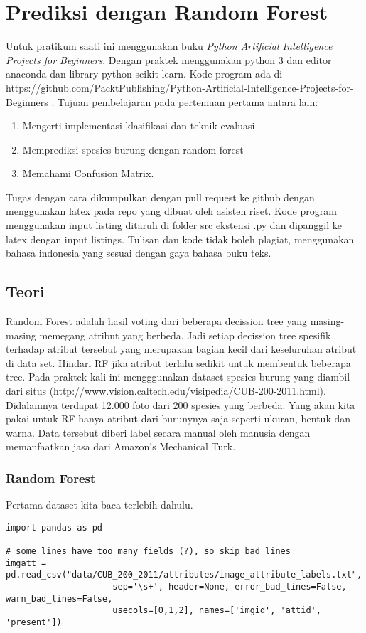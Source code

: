 \chapter{Prediksi dengan Random Forest}

Untuk pratikum saati ini menggunakan buku \textit{Python Artificial Intelligence Projects for Beginners}\cite{eckroth2018python}. Dengan praktek menggunakan python 3 dan editor anaconda dan library python scikit-learn.
Kode program ada di https://github.com/PacktPublishing/Python-Artificial-Intelligence-Projects-for-Beginners .
Tujuan pembelajaran pada pertemuan pertama antara lain:
\begin{enumerate}
\item
Mengerti implementasi klasifikasi dan teknik evaluasi
\item
Memprediksi spesies burung dengan random forest
\item
Memahami Confusion Matrix.
\end{enumerate}
Tugas dengan cara dikumpulkan dengan pull request ke github dengan menggunakan latex pada repo yang dibuat oleh asisten riset. Kode program menggunakan input listing ditaruh di folder src ekstensi .py dan dipanggil ke latex dengan input listings. Tulisan dan kode tidak boleh plagiat, menggunakan bahasa indonesia yang sesuai dengan gaya bahasa buku teks.

\section{Teori}
Random Forest adalah hasil voting dari beberapa decission tree yang masing-masing memegang atribut yang berbeda. Jadi setiap decission tree spesifik terhadap atribut tersebut yang merupakan bagian kecil dari keseluruhan atribut di data set. Hindari RF jika atribut terlalu sedikit untuk membentuk beberapa tree. Pada praktek kali ini mengggunakan dataset spesies burung yang diambil dari situs 
(http://www.vision.caltech.edu/visipedia/CUB-200-2011.html). Didalamnya terdapat 12.000 foto dari 200 spesies yang berbeda. Yang akan kita pakai untuk RF hanya atribut dari burunynya saja seperti ukuran, bentuk dan warna. Data tersebut diberi label secara manual oleh manusia dengan memanfaatkan jasa dari Amazon's Mechanical Turk.

\subsection{Random Forest}
Pertama dataset kita baca terlebih dahulu.
\begin{lstlisting}[caption=Membaca data file txt,label={lst:fungsisederhana}]
import pandas as pd

# some lines have too many fields (?), so skip bad lines
imgatt = pd.read_csv("data/CUB_200_2011/attributes/image_attribute_labels.txt",
                     sep='\s+', header=None, error_bad_lines=False, warn_bad_lines=False,
                     usecols=[0,1,2], names=['imgid', 'attid', 'present'])

\end{lstlisting}

